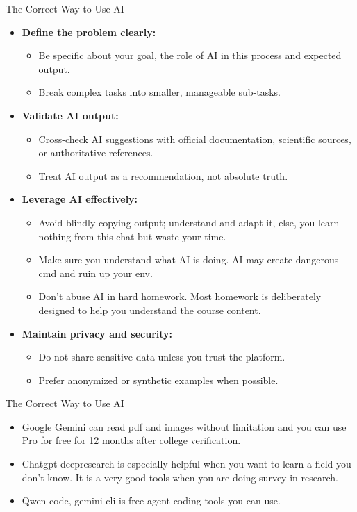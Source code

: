 \begin{frame}[fragile]{The Correct Way to Use AI}
    \begin{itemize}
        \item \textbf{Define the problem clearly:}
        \begin{itemize}
            \item Be specific about your goal, the role of AI in this process and expected output.
            \item Break complex tasks into smaller, manageable sub-tasks.
        \end{itemize}

        \item \textbf{Validate AI output:}
        \begin{itemize}
            \item Cross-check AI suggestions with official documentation, scientific sources, or authoritative references.
            \item Treat AI output as a recommendation, not absolute truth.
        \end{itemize}

        \item \textbf{Leverage AI effectively:}
        \begin{itemize}
            \item Avoid blindly copying output; understand and adapt it, else, you learn nothing from this chat but waste your time.
            \item Make sure you understand what AI is doing. AI may create dangerous cmd and ruin up your env.
            \item Don't abuse AI in hard homework. Most homework is deliberately designed to help you understand the course content.
        \end{itemize}

        \item \textbf{Maintain privacy and security:}
        \begin{itemize}
            \item Do not share sensitive data unless you trust the platform.
            \item Prefer anonymized or synthetic examples when possible.
        \end{itemize}
    \end{itemize}
\end{frame}

\begin{frame}[fragile]{The Correct Way to Use AI}
    \begin{itemize}
			\item Google Gemini can read pdf and images without limitation and you can use Pro for free for 12 months after college verification.
			\item Chatgpt deepresearch is especially helpful when you want to learn a field you don't know. It is a very good tools when you are doing survey in research.
			\item Qwen-code, gemini-cli is free agent coding tools you can use.
    \end{itemize}
\end{frame}
